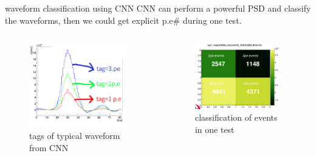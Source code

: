 \documentclass[11pt,compress,xcolor=x11names,UTF8]{beamer}
\begin{document}
\begin{frame}{waveform classification using CNN}
CNN can perform a powerful PSD and classify the waveforms, then we could get explicit p.e# during one test.   
\begin{columns}
\begin{column}{.485\textwidth}
\begin{figure}
\centering
\includegraphics[width=0.94\textwidth]{figure/cnntags.png} %
\caption{tags of typical waveform from CNN}
\end{figure}
\end{column}
\begin{column}{.485\textwidth}
\begin{figure}
\centering
\includegraphics[width=0.94\textwidth]{figure/cnnres.png} %
\caption{classification of events in one test}
\end{figure}
\end{column}
\end{columns}

\end{frame}
\end{document}
